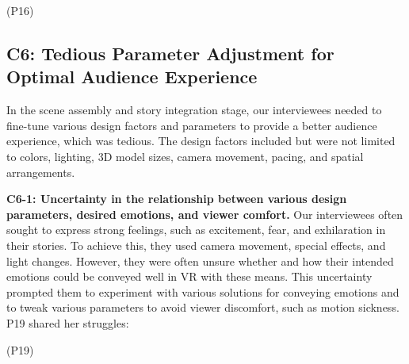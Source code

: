  (P16)


\subsection{C6: Tedious Parameter Adjustment for Optimal Audience Experience}
\label{sec:tedious_adjustment}
In the scene assembly and story integration stage, our interviewees needed to fine-tune various design factors and parameters to provide a better audience experience, which was tedious. The design factors included but were not limited to colors, lighting, 3D model sizes, camera movement, pacing, and spatial arrangements.

\textbf{C6-1: Uncertainty in the relationship between various design parameters, desired emotions, and viewer comfort.}
Our interviewees often sought to express strong feelings, such as excitement, fear, and exhilaration in their stories. To achieve this, they used camera movement, special effects, and light changes. However, they were often unsure whether and how their intended emotions could be conveyed well in VR with these means. This uncertainty prompted them to experiment with various solutions for conveying emotions and to tweak various parameters to avoid viewer discomfort, such as motion sickness. P19 shared her struggles:

 (P19)
